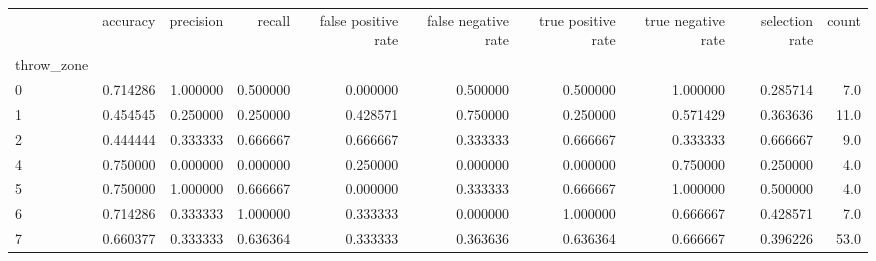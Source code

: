 \begin{tabular}{lrrrrrrrrr}
\toprule
{} &  accuracy &  precision &    recall &  false positive rate &  false negative rate &  true positive rate &  true negative rate &  selection rate &  count \\
throw\_zone &           &            &           &                      &                      &                     &                     &                 &        \\
\midrule
0          &  0.714286 &   1.000000 &  0.500000 &             0.000000 &             0.500000 &            0.500000 &            1.000000 &        0.285714 &    7.0 \\
1          &  0.454545 &   0.250000 &  0.250000 &             0.428571 &             0.750000 &            0.250000 &            0.571429 &        0.363636 &   11.0 \\
2          &  0.444444 &   0.333333 &  0.666667 &             0.666667 &             0.333333 &            0.666667 &            0.333333 &        0.666667 &    9.0 \\
4          &  0.750000 &   0.000000 &  0.000000 &             0.250000 &             0.000000 &            0.000000 &            0.750000 &        0.250000 &    4.0 \\
5          &  0.750000 &   1.000000 &  0.666667 &             0.000000 &             0.333333 &            0.666667 &            1.000000 &        0.500000 &    4.0 \\
6          &  0.714286 &   0.333333 &  1.000000 &             0.333333 &             0.000000 &            1.000000 &            0.666667 &        0.428571 &    7.0 \\
7          &  0.660377 &   0.333333 &  0.636364 &             0.333333 &             0.363636 &            0.636364 &            0.666667 &        0.396226 &   53.0 \\
\bottomrule
\end{tabular}
